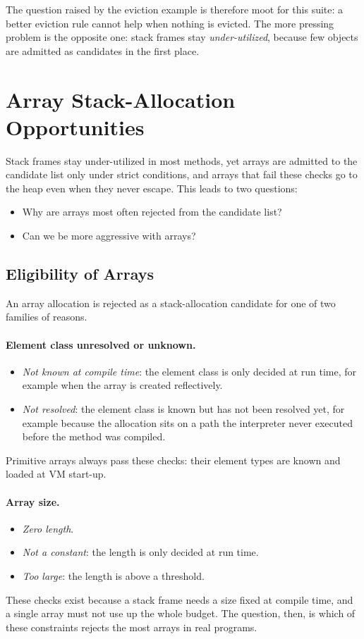 \begin{notebox}
The question raised by the eviction example is therefore moot for this suite: a better eviction
rule cannot help when nothing is evicted. The more pressing problem is the opposite one: stack
frames stay \emph{under-utilized}, because few objects are admitted as candidates in the first
place.
\end{notebox}

\section{Array Stack-Allocation Opportunities}

Stack frames stay under-utilized in most methods, yet arrays are admitted to the candidate list
only under strict conditions, and arrays that fail these checks go to the heap even when they
never escape. This leads to two questions:
\begin{itemize}
  \item Why are arrays most often rejected from the candidate list?
  \item Can we be more aggressive with arrays?
\end{itemize}

\subsection{Eligibility of Arrays}

An array allocation is rejected as a stack-allocation candidate for one of two families of
reasons.

\paragraph{Element class unresolved or unknown.}
\begin{itemize}
  \item \emph{Not known at compile time}: the element class is only decided at run time, for
        example when the array is created reflectively.
  \item \emph{Not resolved}: the element class is known but has not been resolved yet, for
        example because the allocation sits on a path the interpreter never executed before the
        method was compiled.
\end{itemize}
Primitive arrays always pass these checks: their element types are known and loaded at VM
start-up.

\paragraph{Array size.}
\begin{itemize}
  \item \emph{Zero length}.
  \item \emph{Not a constant}: the length is only decided at run time.
  \item \emph{Too large}: the length is above a threshold.
\end{itemize}
These checks exist because a stack frame needs a size fixed at compile time, and a single array
must not use up the whole budget. The question, then, is which of these constraints rejects the
most arrays in real programs.

